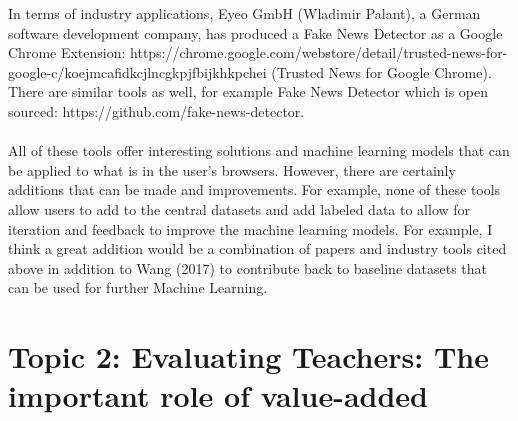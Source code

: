 \documentclass[12pt, final]{article}
\begin{document}
In terms of industry applications, Eyeo GmbH (Wladimir Palant), a German software development company, has produced a Fake News Detector as a Google Chrome Extension: https://chrome.google.com/webstore/detail/trusted-news-for-google-c/koejmcafidkcjlncgkpjfbijkhkpchei (Trusted News for Google Chrome). There are similar tools as well, for example Fake News Detector which is open sourced: https://github.com/fake-news-detector.
\\
\\
All of these tools offer interesting solutions and machine learning models that can be applied to what is in the user's browsers. However, there are certainly additions that can be made and improvements. For example, none of these tools allow users to add to the central datasets and add labeled data to allow for iteration and feedback to improve the machine learning models. For example, I think a great addition would be a combination of papers and industry tools cited above in addition to Wang (2017) \cite{Wang} to contribute back to baseline datasets that can be used for further Machine Learning.

\section{Topic 2: Evaluating Teachers: The important role of value-added}
\end{document}
